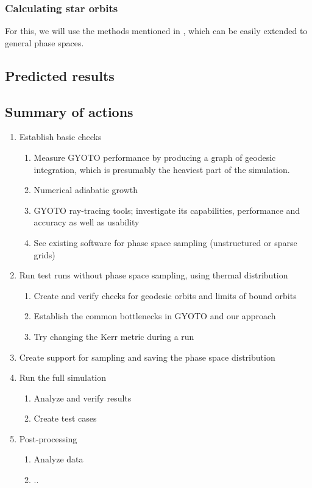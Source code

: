 \documentclass[12pt]{article}
\begin{document}
\subsubsection{Calculating star orbits}

For this, we will use the methods mentioned in \citep{Sadeghian_Ferrer_Will_2013}, which can be easily extended to 
general phase spaces.

\subsection{Predicted results}


\subsection{Summary of actions} \label{ssec:actions}


\begin{enumerate}
 \item Establish basic checks
 \begin{enumerate}
  \item Measure GYOTO performance by producing a graph of geodesic integration, which is presumably the heaviest part of the simulation.
  \item Numerical adiabatic growth \citep{Sadeghian_Ferrer_Will_2013}
  \item GYOTO ray-tracing tools; investigate its capabilities, performance and accuracy as well as usability
  \item See existing software for phase space sampling (unstructured or sparse grids)
 \end{enumerate}
 \item Run test runs without phase space sampling, using thermal distribution
 \begin{enumerate}
  \item Create and verify checks for geodesic orbits and limits of bound orbits
  \item Establish the common bottlenecks in GYOTO and our approach
  \item Try changing the Kerr metric during a run
 \end{enumerate}
 \item Create support for sampling and saving the phase space distribution
 \item Run the full simulation
 \begin{enumerate}
  \item Analyze and verify results
  \item Create test cases
 \end{enumerate}
 \item Post-processing
 \begin{enumerate}
  \item Analyze data
  \item ..
 \end{enumerate}
\end{enumerate}
\end{document}
